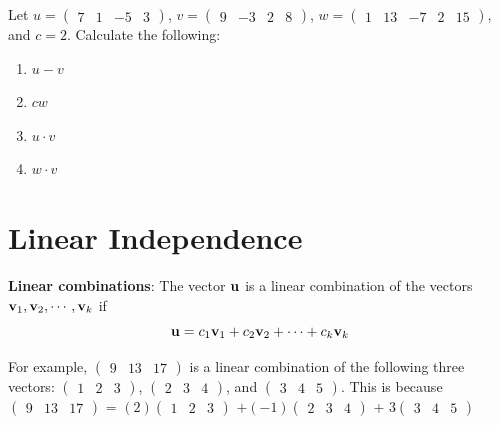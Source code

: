 \documentclass[]{book}
\theoremstyle{definition}
\theoremstyle{definition}
\theoremstyle{definition}
\theoremstyle{remark}
\let\BeginKnitrBlock\begin \let\EndKnitrBlock\end
\begin{document}
\BeginKnitrBlock{exercise}[Vector Algebra]
\protect\hypertarget{exr:vectors1}{}{\label{exr:vectors1} {} } Let \(u = \begin{pmatrix} 7&1&-5&3\end{pmatrix}\),
\(v = \begin{pmatrix} 9&-3&2&8 \end{pmatrix}\),
\(w = \begin{pmatrix} 1&13& -7&2 &15 \end{pmatrix}\), and \(c = 2\).
Calculate the following:

\begin{enumerate}
\def\labelenumi{\arabic{enumi}.}
\item
  \(u-v\)
\item
  \(cw\)
\item
  \(u \cdot v\)
\item
  \(w \cdot v\)
\end{enumerate}
\EndKnitrBlock{exercise}

\section{Linear Independence}\label{linearindependence}

\textbf{Linear combinations}: The vector \({\bf u}\) is a linear
combination of the vectors \({\bf v}_1, {\bf v}_2, \cdots , {\bf v}_k\)
if \[{\bf u} = c_1{\bf v}_1 + c_2{\bf v}_2 +  \cdots + c_k{\bf v}_k\]

For example, \(\begin{pmatrix}9 & 13 & 17 \end{pmatrix}\) is a linear
combination of the following three vectors:
\(\begin{pmatrix}1 & 2 & 3 \end{pmatrix}\),
\(\begin{pmatrix} 2 & 3& 4\end{pmatrix}\), and
\(\begin{pmatrix} 3 & 4 & 5 \end{pmatrix}\). This is because
\(\begin{pmatrix}9 & 13 & 17 \end{pmatrix}\) =
\((2)\begin{pmatrix}1 & 2 & 3 \end{pmatrix}\)
\(+ (-1)\begin{pmatrix} 2 & 3& 4\end{pmatrix}\) +
\(3\begin{pmatrix} 3 & 4 & 5 \end{pmatrix}\)
\end{document}
